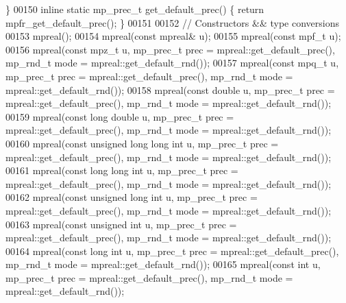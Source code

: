 \begin{DoxyCode}
             \}
00150     \textcolor{keyword}{inline} \textcolor{keyword}{static} mp\_prec\_t  get\_default\_prec()   \{    \textcolor{keywordflow}{return} mpfr\_get\_default\_prec();                     
             \}
00151 
00152     \textcolor{comment}{// Constructors && type conversions}
00153     mpreal();
00154     mpreal(\textcolor{keyword}{const} mpreal& u);
00155     mpreal(\textcolor{keyword}{const} mpf\_t u);
00156     mpreal(\textcolor{keyword}{const} mpz\_t u,                  mp\_prec\_t prec = mpreal::get\_default\_prec(), mp\_rnd\_t mode = 
      mpreal::get\_default\_rnd());
00157     mpreal(\textcolor{keyword}{const} mpq\_t u,                  mp\_prec\_t prec = mpreal::get\_default\_prec(), mp\_rnd\_t mode = 
      mpreal::get\_default\_rnd());
00158     mpreal(\textcolor{keyword}{const} \textcolor{keywordtype}{double} u,                 mp\_prec\_t prec = mpreal::get\_default\_prec(), mp\_rnd\_t mode = 
      mpreal::get\_default\_rnd());
00159     mpreal(\textcolor{keyword}{const} \textcolor{keywordtype}{long} \textcolor{keywordtype}{double} u,            mp\_prec\_t prec = mpreal::get\_default\_prec(), mp\_rnd\_t mode = 
      mpreal::get\_default\_rnd());
00160     mpreal(\textcolor{keyword}{const} \textcolor{keywordtype}{unsigned} \textcolor{keywordtype}{long} \textcolor{keywordtype}{long} \textcolor{keywordtype}{int} u, mp\_prec\_t prec = mpreal::get\_default\_prec(), mp\_rnd\_t mode = 
      mpreal::get\_default\_rnd());
00161     mpreal(\textcolor{keyword}{const} \textcolor{keywordtype}{long} \textcolor{keywordtype}{long} \textcolor{keywordtype}{int} u,          mp\_prec\_t prec = mpreal::get\_default\_prec(), mp\_rnd\_t mode = 
      mpreal::get\_default\_rnd());
00162     mpreal(\textcolor{keyword}{const} \textcolor{keywordtype}{unsigned} \textcolor{keywordtype}{long} \textcolor{keywordtype}{int} u,      mp\_prec\_t prec = mpreal::get\_default\_prec(), mp\_rnd\_t mode = 
      mpreal::get\_default\_rnd());
00163     mpreal(\textcolor{keyword}{const} \textcolor{keywordtype}{unsigned} \textcolor{keywordtype}{int} u,           mp\_prec\_t prec = mpreal::get\_default\_prec(), mp\_rnd\_t mode = 
      mpreal::get\_default\_rnd());
00164     mpreal(\textcolor{keyword}{const} \textcolor{keywordtype}{long} \textcolor{keywordtype}{int} u,               mp\_prec\_t prec = mpreal::get\_default\_prec(), mp\_rnd\_t mode = 
      mpreal::get\_default\_rnd());
00165     mpreal(\textcolor{keyword}{const} \textcolor{keywordtype}{int} u,                    mp\_prec\_t prec = mpreal::get\_default\_prec(), mp\_rnd\_t mode = 
      mpreal::get\_default\_rnd());

\end{DoxyCode}
